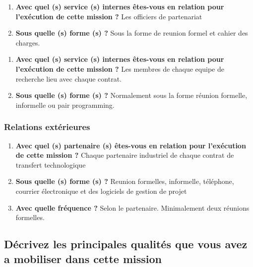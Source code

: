 \documentclass{resume} %
\begin{document}
	\begin{enumerate}
		\item \textbf{ Avec quel (s) service (s) internes êtes-vous en relation pour l'exécution de cette mission ?}
			Les officiers de partenariat  
		\item \textbf{Sous quelle (s) forme (s) ?}
			Sous la forme de reunion formel et cahier des charges. 
	\end {enumerate}
	\begin{enumerate}
		\item \textbf{ Avec quel (s) service (s) internes êtes-vous en relation pour l'exécution de cette mission ?}
			Les membres de chaque equipe de recherche lieu avec chaque contrat.
		\item \textbf{Sous quelle (s) forme (s) ?}
			Normalement sous la forme réunion formelle, informelle ou pair programming. 
	\end {enumerate}	

	\subsubsection {Relations extérieures}
		\begin{enumerate}
		\item \textbf{Avec quel (s) partenaire (s) êtes-vous en relation pour l'exécution de cette mission ?}
			Chaque partenaire industriel de chaque contrat de transfert technologique 
		\item \textbf{ Sous quelle (s) forme (s) ?}
			Reunion formelles, informelle, téléphone, courrier électronique et des logiciels de gestion de projet
		\item \textbf{ Avec quelle fréquence ?}
			Selon le partenaire. Minimalement deux réunions formelles. 
		\end {enumerate}			


	\subsection{Décrivez les principales qualités que vous avez a mobiliser dans cette mission}
			
\end{document}
